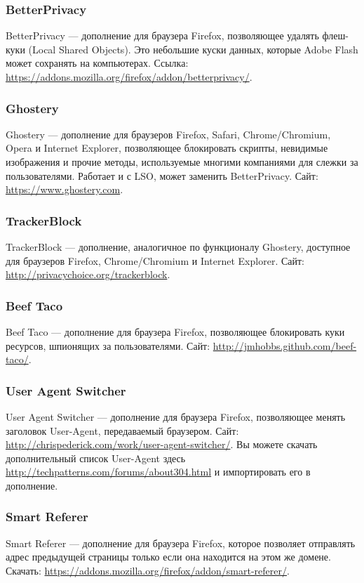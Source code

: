 \subsubsection{BetterPrivacy}
BetterPrivacy --- дополнение для браузера Firefox, позволяющее удалять флеш-куки (Local Shared Objects). Это небольшие куски данных, которые Adobe Flash может сохранять на компьютерах. Ссылка: \url{https://addons.mozilla.org/firefox/addon/betterprivacy/}.
\subsubsection{Ghostery}
Ghostery --- дополнение для браузеров Firefox, Safari, Chrome/Chromium, Opera и Internet Explorer, позволяющее блокировать скрипты, невидимые изображения и прочие методы, используемые многими компаниями для слежки за пользователями. Работает и с LSO, может заменить BetterPrivacy. Сайт: \url{https://www.ghostery.com}.
\subsubsection{TrackerBlock}
TrackerBlock --- дополнение, аналогичное по функционалу Ghostery, доступное для браузеров Firefox, Chrome/Chromium и Internet Explorer. Сайт: \url{http://privacychoice.org/trackerblock}.
\subsubsection{Beef Taco}
Beef Taco --- дополнение для браузера Firefox, позволяющее блокировать куки ресурсов, шпионящих за пользователями. Сайт: \url{http://jmhobbs.github.com/beef-taco/}.
\subsubsection{User Agent Switcher}
User Agent Switcher --- дополнение для браузера Firefox, позволяющее менять заголовок User-Agent, передаваемый браузером. Сайт: \url{http://chrispederick.com/work/user-agent-switcher/}. Вы можете скачать дополнительный список User-Agent здесь \url{http://techpatterns.com/forums/about304.html} и импортировать его в дополнение.
\subsubsection{Smart Referer}
Smart Referer --- дополнение для браузера Firefox, которое позволяет отправлять адрес предыдущей страницы только если она находится на этом же домене. Скачать: \url{https://addons.mozilla.org/firefox/addon/smart-referer/}.
